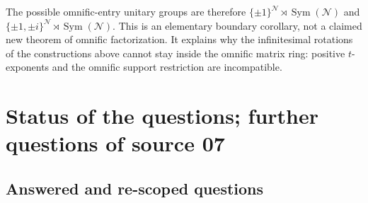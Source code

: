\documentclass[11pt,letterpaper]{article}
\numberwithin{equation}{section}
\theoremstyle{definition}
\theoremstyle{remark}
\begin{document}
The possible omnific-entry unitary groups are therefore
$\{\pm1\}^{\mathcal N}\rtimes\operatorname{Sym}(\mathcal N)$ and
$\{\pm1,\pm i\}^{\mathcal N}\rtimes\operatorname{Sym}(\mathcal N)$. This is an
elementary boundary corollary, not a claimed new theorem of omnific
factorization. It explains why the infinitesimal rotations of the
constructions above cannot stay inside the omnific matrix ring: positive
$t$-exponents and the omnific support restriction are incompatible.

\section{Status of the questions; further questions of source 07}
\label{hgeo:us:sec:questions}

\subsection{Answered and re-scoped questions}\label{hgeo:us:sub:status}
\end{document}

